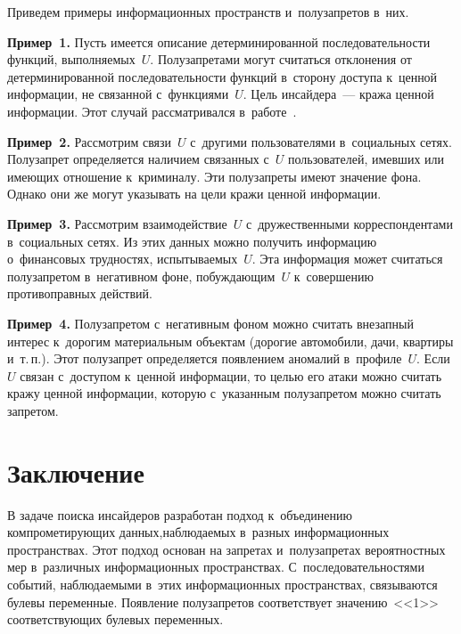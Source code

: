 \begin{multicols}{2}
  Приведем примеры информационных пространств и~полузапретов в~них. 
  
  \noindent
  \textbf{Пример~1.} Пусть имеется описание детерминированной 
последовательности функций, вы\-пол\-ня\-емых~$U$. Полузапретами могут 
считаться отклонения от детерминированной последовательности функций 
в~сторону доступа к~ценной информации, не связанной с~функциями~$U$. 
Цель инсайдера~--- кража ценной информации. Этот случай рас\-смат\-ри\-вал\-ся 
в~работе~\cite{6-gr}.
  
  \smallskip
  
  \noindent
  \textbf{Пример~2.} Рассмотрим связи~$U$ с~другими пользователями 
в~социальных сетях. Полузапрет определяется наличием связанных с~$U$ 
пользователей, имевших или имеющих отношение к~криминалу. Эти 
полузапреты имеют значение фона. Однако они же могут указывать на цели 
кражи ценной информации. 
  
  \smallskip
  
  \noindent
  \textbf{Пример~3.} Рассмотрим взаимодействие~$U$ с~дружественными 
корреспондентами в~социальных сетях. Из этих данных можно получить 
информацию о~финансовых трудностях, испытываемых~$U$. Эта информация 
может считаться полузапретом в~негативном фоне, побуждающим~$U$ 
к~совершению противоправных действий. 
  
  \smallskip
  
  \noindent
  \textbf{Пример~4.} Полузапретом с~негативным фоном можно считать 
внезапный интерес к~дорогим материальным объектам (дорогие автомобили, 
дачи, квартиры и~т.\,п.). Этот полузапрет определяется появлением аномалий 
в~профиле~$U$. Если~$U$ связан с~доступом к~ценной информации, то целью 
его атаки можно считать кражу ценной информации, которую с~указанным 
полузапретом можно считать запретом. 
  
\section{Заключение}

  В задаче поиска инсайдеров разработан подход к~объединению 
компрометирующих данных,\linebreak наблю\-да\-емых в~разных информационных 
про\-стран\-ст\-вах. Этот подход основан на запретах и~полуза\-пре\-тах вероятностных 
мер в~различных\linebreak 
информационных пространствах. С~последовательностями 
событий, наблюдаемыми в~этих информационных пространствах, связываются 
булевы переменные. Появление полузапретов соответствует значению~<<1>> 
соответствующих булевых переменных. 
  

\end{multicols}

